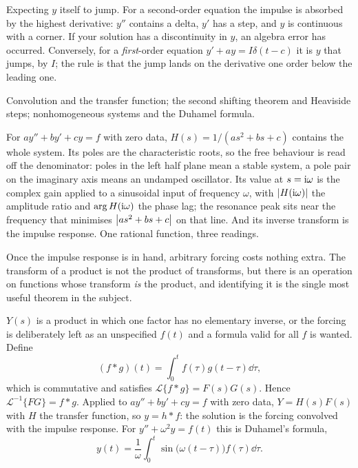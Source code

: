 \begin{trap}
Expecting $y$ itself to jump. For a second-order equation the impulse is absorbed by the highest derivative: $y''$ contains a delta, $y'$ has a step, and $y$ is continuous with a corner. If your solution has a discontinuity in $y$, an algebra error has occurred. Conversely, for a \emph{first}-order equation $y'+ay=I\delta(t-c)$ it is $y$ that jumps, by $I$; the rule is that the jump lands on the derivative one order below the leading one.
\end{trap}

\begin{seealsob}Convolution and the transfer function; the second shifting theorem and Heaviside steps; nonhomogeneous systems and the Duhamel formula.\end{seealsob}

\begin{keynote}
For $ay''+by'+cy=f$ with zero data, $H(s)=1/(as^{2}+bs+c)$ contains the whole system. Its poles are the characteristic roots, so the free behaviour is read off the denominator: poles in the left half plane mean a stable system, a pole pair on the imaginary axis means an undamped oscillator. Its value at $s=\mathrm{i}\omega$ is the complex gain applied to a sinusoidal input of frequency $\omega$, with $\left\lvert H(\mathrm{i}\omega)\right\rvert$ the amplitude ratio and $\arg H(\mathrm{i}\omega)$ the phase lag; the resonance peak sits near the frequency that minimises $\left\lvert as^{2}+bs+c\right\rvert$ on that line. And its inverse transform is the impulse response. One rational function, three readings.
\end{keynote}

Once the impulse response is in hand, arbitrary forcing costs nothing extra. The transform of a product is not the product of transforms, but there is an operation on functions whose transform \emph{is} the product, and identifying it is the single most useful theorem in the subject.

\cue $Y(s)$ is a product in which one factor has no elementary inverse, or the forcing is deliberately left as an unspecified $f(t)$ and a formula valid for all $f$ is wanted.
\method Define
\[(f*g)(t)=\int_0^{t}f(\tau)g(t-\tau)\dd\tau,\]
which is commutative and satisfies $\mathcal{L}\{f*g\}=F(s)G(s)$. Hence $\mathcal{L}^{-1}\{FG\}=f*g$. Applied to $ay''+by'+cy=f$ with zero data, $Y=H(s)F(s)$ with $H$ the transfer function, so $y=h*f$: the solution is the forcing convolved with the impulse response. For $y''+\omega^{2}y=f(t)$ this is Duhamel's formula,
\[y(t)=\frac1{\omega}\int_0^{t}\sin\bigl(\omega(t-\tau)\bigr)f(\tau)\dd\tau.\]

